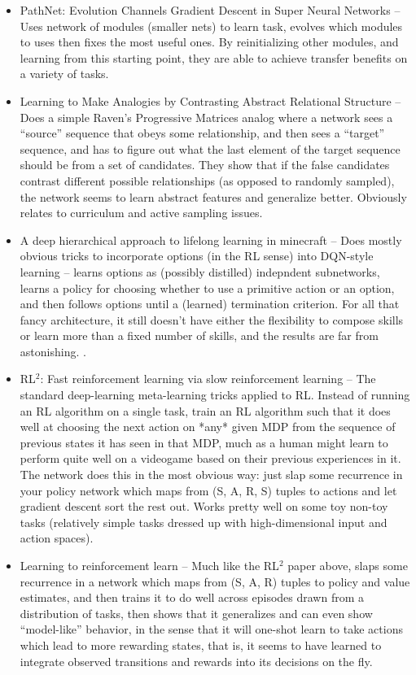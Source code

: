 \documentclass[10pt]{article}
\begin{document}
\begin{itemize}
\item PathNet: Evolution Channels Gradient Descent in Super Neural Networks -- Uses network of modules (smaller nets) to learn task, evolves which modules to uses then fixes the most useful ones. By reinitializing other modules, and learning from this starting point, they are able to achieve transfer benefits on a variety of tasks. \citep{Fernando2017}
\item Learning to Make Analogies by Contrasting Abstract Relational Structure -- Does a simple Raven's Progressive Matrices analog where a network sees a ``source'' sequence that obeys some relationship, and then sees a ``target'' sequence, and has to figure out what the last element of the target sequence should be from a set of candidates. They show that if the false candidates contrast different possible relationships (as opposed to randomly sampled), the network seems to learn abstract features and generalize better. Obviously relates to curriculum and active sampling issues. \citep{Hill2019}
\item A deep hierarchical approach to lifelong learning in minecraft -- Does mostly obvious tricks to incorporate options (in the RL sense) into DQN-style learning -- learns options as (possibly distilled) indepndent subnetworks, learns a policy for choosing whether to use a primitive action or an option, and then follows options until a (learned) termination criterion. For all that fancy architecture, it still doesn't have either the flexibility to compose skills or learn more than a fixed number of skills, and the results are far from astonishing. \citep{Tessler2016}.
\item RL$^2$: Fast reinforcement learning via slow reinforcement learning -- The standard deep-learning meta-learning tricks applied to RL. Instead of running an RL algorithm on a single task, train an RL algorithm such that it does well at choosing the next action on *any* given MDP from the sequence of previous states it has seen in that MDP, much as a human might learn to perform quite well on a videogame based on their previous experiences in it. The network does this in the most obvious way: just slap some recurrence in your policy network which maps from (S, A, R, S) tuples to actions and let gradient descent sort the rest out. Works pretty well on some toy non-toy tasks (relatively simple tasks dressed up with high-dimensional input and action spaces).
\item Learning to reinforcement learn -- Much like the RL$^2$ paper above, slaps some recurrence in a network which maps from (S, A, R) tuples to policy and value estimates, and then trains it to do well across episodes drawn from a distribution of tasks, then shows that it generalizes and can even show ``model-like'' behavior, in the sense that it will one-shot learn to take actions which lead to more rewarding states, that is, it seems to have learned to integrate observed transitions and rewards into its decisions on the fly. 

\end{itemize}
\end{document}
